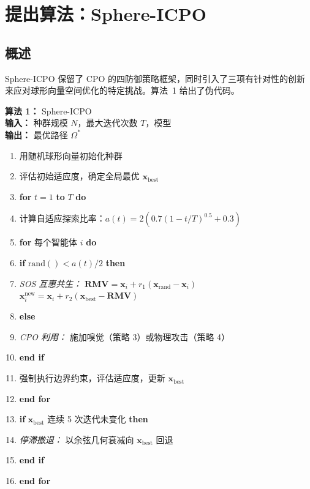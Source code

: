 \documentclass[11pt,a4paper]{ctexart}
\begin{document}
\section{提出算法：Sphere-ICPO}

\subsection{概述}

Sphere-ICPO 保留了 CPO 的四防御策略框架，同时引入了三项有针对性的创新来应对球形向量空间优化的特定挑战。算法~1 给出了伪代码。

\medskip
\noindent\textbf{算法 1：} Sphere-ICPO\\
\textbf{输入：} 种群规模 $N$，最大迭代次数 $T$，模型\\
\textbf{输出：} 最优路径 $\Omega^*$

\begin{enumerate}
    \item 用随机球形向量初始化种群
    \item 评估初始适应度，确定全局最优 $\mathbf{x}_{\text{best}}$
    \item \textbf{for} $t = 1$ \textbf{to} $T$ \textbf{do}
    \item \quad 计算自适应探索比率：$a(t) = 2(0.7(1-t/T)^{0.5} + 0.3)$
    \item \quad \textbf{for} 每个智能体 $i$ \textbf{do}
    \item \quad\quad \textbf{if} $\text{rand}() < a(t)/2$ \textbf{then}
    \item \quad\quad\quad \textit{SOS 互惠共生：} $\mathbf{RMV} = \mathbf{x}_i + r_1(\mathbf{x}_{\text{rand}} - \mathbf{x}_i)$\\
    \quad\quad\quad $\mathbf{x}_i^{\text{new}} = \mathbf{x}_i + r_2(\mathbf{x}_{\text{best}} - \mathbf{RMV})$
    \item \quad\quad \textbf{else}
    \item \quad\quad\quad \textit{CPO 利用：} 施加嗅觉（策略 3）或物理攻击（策略 4）
    \item \quad\quad \textbf{end if}
    \item \quad\quad 强制执行边界约束，评估适应度，更新 $\mathbf{x}_{\text{best}}$
    \item \quad \textbf{end for}
    \item \quad \textbf{if} $\mathbf{x}_{\text{best}}$ 连续 5 次迭代未变化 \textbf{then}
    \item \quad\quad \textit{停滞撤退：} 以余弦几何衰减向 $\mathbf{x}_{\text{best}}$ 回退
    \item \quad \textbf{end if}
    \item \textbf{end for}
\end{enumerate}
\end{document}
